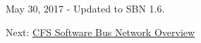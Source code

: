 \begin{DoxyVerb}May 30, 2017 - Updated to SBN 1.6.
\end{DoxyVerb}


Next\-: \hyperlink{cfssbnovr}{C\-F\-S Software Bus Network Overview} 